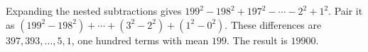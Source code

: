 Expanding the nested subtractions gives $199^2-198^2+197^2-\cdots-2^2+1^2$. Pair it as $(199^2-198^2)+\cdots+(3^2-2^2)+(1^2-0^2)$. These differences are $397,393,\ldots,5,1$, one hundred terms with mean $199$. The result is $\boxed{19900}$.
